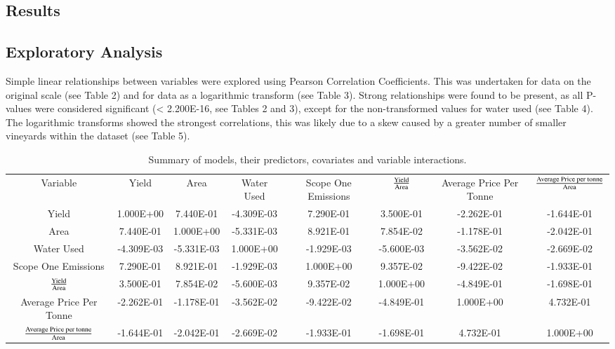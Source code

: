 \documentclass[review,12pt,authoryear]{elsarticle}
\begin{document}
\begin{linenumbers}
\section{Results}
\subsection{Exploratory Analysis}
Simple linear relationships between variables were explored using Pearson Correlation Coefficients. This was undertaken for data on the original scale (see Table 2) and for data as a logarithmic transform (see Table 3). Strong relationships were found to be present, as all P-values were considered significant (< 2.200E-16, see Tables 2 and 3), except for the non-transformed values for water used (see Table 4). The logarithmic transforms showed the strongest correlations, this was likely due to a skew caused by a greater number of smaller vineyards within the dataset (see Table 5).

\begin{table}[]
  \caption{Summary of models, their predictors, covariates and variable interactions.}
  \label{tab:tab2}
  \begin{tabular}{cccccccc}
  Variable                             & Yield      & Area       & Water Used & Scope One Emissions & $\textrm{Yield}\over\textrm{Area}$ & Average Price Per Tonne & ${\textrm{Average Price per tonne}\over\textrm{Area}}$ \\
  Yield                                & 1.000E+00  & 7.440E-01  & -4.309E-03 & 7.290E-01           & 3.500E-01            & -2.262E-01              & -1.644E-01                           \\
  Area                                 & 7.440E-01  & 1.000E+00  & -5.331E-03 & 8.921E-01           & 7.854E-02            & -1.178E-01              & -2.042E-01                           \\
  Water Used                           & -4.309E-03 & -5.331E-03 & 1.000E+00  & -1.929E-03          & -5.600E-03           & -3.562E-02              & -2.669E-02                           \\
  Scope One Emissions                  & 7.290E-01  & 8.921E-01  & -1.929E-03 & 1.000E+00           & 9.357E-02            & -9.422E-02              & -1.933E-01                           \\
  $\textrm{Yield}\over\textrm{Area}$                 & 3.500E-01  & 7.854E-02  & -5.600E-03 & 9.357E-02           & 1.000E+00            & -4.849E-01              & -1.698E-01                           \\
  Average Price Per Tonne              & -2.262E-01 & -1.178E-01 & -3.562E-02 & -9.422E-02          & -4.849E-01           & 1.000E+00               & 4.732E-01                            \\
  ${\textrm{Average Price per tonne}\over\textrm{Area}}$ & -1.644E-01 & -2.042E-01 & -2.669E-02 & -1.933E-01          & -1.698E-01           & 4.732E-01               & 1.000E+00                           
  \end{tabular}
  \end{table}


\end{linenumbers}
\end{document}
